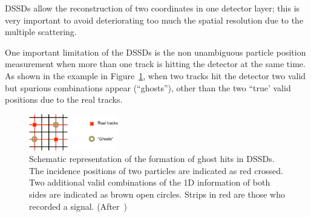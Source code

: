   DSSDs allow the reconstruction of two coordinates in one detector layer; 
 this is very important to avoid deteriorating too much the spatial resolution 
 due to the multiple scattering. 

One important limitation of the DSSDs is the non unambiguous particle position measurement when 
more than one track is hitting the detector at the same time. As shown in the example 
in Figure~\ref{fig:ghosts}, when two tracks hit the detector two valid but spurious combinations 
appear (``ghosts''),  other than the two ``true' valid positions due to the real tracks.

  \begin{figure}[htbp]
   \centering
  \includegraphics[width=0.35\textwidth]{ghosts.pdf} 
      \caption{\label{fig:ghosts} Schematic representation of the formation of ghost hits in 
     DSSDs. The incidence positions of two particles are indicated as  red 
      crossed. Two additional valid combinations of the 1D information of both sides are indicated 
      as brown open circles. Strips in red are those who recorded a signal. (After~\cite{Krammer})}
\end{figure}


